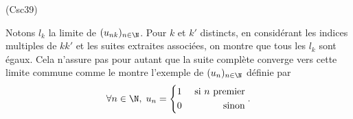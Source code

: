\begin{tiny}(Csc39)\end{tiny} Notons $l_k$ la limite de $(u_{nk})_{n\in \N}$. Pour $k$ et $k'$ distincts, en considérant les indices multiples de $kk'$ et les suites extraites associées, on montre que tous les $l_k$ sont égaux. Cela n'assure pas pour autant que la suite complète converge vers cette limite commune comme le montre l'exemple de $(u_{n})_{n\in \N}$ définie par
\[
  \forall n \in \N, \;
  u_n = 
  \left\lbrace
  \begin{aligned}
    &1 &\text{ si } n \text{ premier} \\
    &0 &\text{ sinon}
  \end{aligned}
  \right. .
\]
